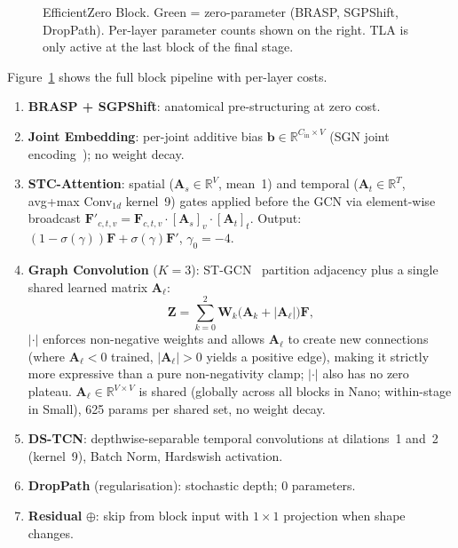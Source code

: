 \documentclass[sigconf,screen,review,anonymous]{acmart}
\begin{document}
\begin{figure}[htpb]\vspace{-2mm}
\centering
\resizebox{0.75\columnwidth}{!}{}
\caption{EfficientZero Block. Green = zero-parameter (BRASP, SGPShift,
  DropPath). Per-layer parameter counts shown on the right.
  TLA is only active at the last block of the final stage.}
\label{fig:block}
\vspace{-3mm}\end{figure}

Figure~\ref{fig:block} shows the full block pipeline with per-layer costs.

\begin{enumerate}[leftmargin=*,topsep=1pt,itemsep=2pt]
\item \textbf{BRASP + SGPShift}: anatomical pre-structuring at zero cost.
\item \textbf{Joint Embedding}: per-joint additive bias
  $\mathbf{b}\!\in\!\mathbb{R}^{C_\text{in}\times V}$
  (SGN joint encoding~\cite{sgn}); no weight decay.
\item \textbf{STC-Attention}: spatial ($\mathbf{A}_s\!\in\!\mathbb{R}^V$, mean~1)
  and temporal ($\mathbf{A}_t\!\in\!\mathbb{R}^T$, avg+max Conv$_{1d}$ kernel~9)
  gates applied before the GCN via element-wise broadcast
  $\mathbf{F}'_{c,t,v}{=}\mathbf{F}_{c,t,v}{\cdot}[\mathbf{A}_s]_v{\cdot}[\mathbf{A}_t]_t$.
  Output: $(1{-}\sigma(\gamma))\mathbf{F}+\sigma(\gamma)\mathbf{F}'$,
  $\gamma_0{=}{-}4$.
\item \textbf{Graph Convolution} ($K{=}3$): ST-GCN~\cite{stgcn} partition
  adjacency plus a single shared learned matrix $\mathbf{A}_\ell$:
  \begin{equation}
    \mathbf{Z} = \sum_{k=0}^{2}\mathbf{W}_k
      \bigl(\mathbf{A}_k + |\mathbf{A}_\ell|\bigr)\mathbf{F},
    \label{eq:gcn}
  \end{equation}
  $|\cdot|$ enforces non-negative weights and allows $\mathbf{A}_\ell$ to
  create new connections (where $\mathbf{A}_\ell{<}0$ trained,
  $|\mathbf{A}_\ell|{>}0$ yields a positive edge), making it strictly more
  expressive than a pure non-negativity clamp; $|\cdot|$ also has no zero plateau.
  $\mathbf{A}_\ell\!\in\!\mathbb{R}^{V\times V}$ is shared (globally across
  all blocks in Nano; within-stage in Small), 625 params per shared set, no weight decay.
\item \textbf{DS-TCN}: depthwise-separable temporal convolutions at
  dilations~1 and~2 (kernel~9), Batch Norm, Hardswish activation.
\item \textbf{DropPath} (regularisation): stochastic depth; 0 parameters.
\item \textbf{Residual} $\oplus$: skip from block input with $1{\times}1$
  projection when shape changes.
\end{enumerate}
\end{document}
